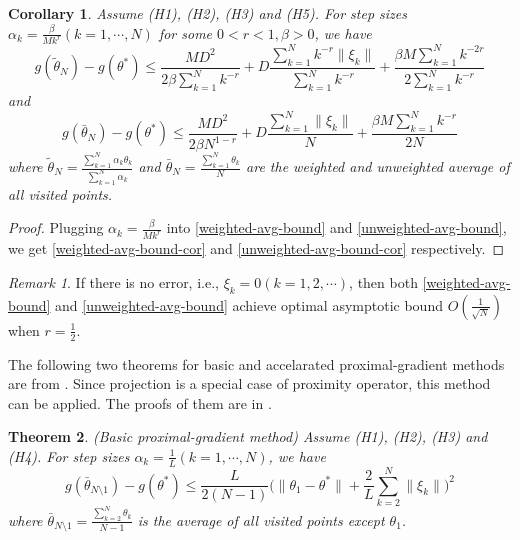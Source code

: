\documentclass[psamsfonts]{article}
\newtheorem{thm}{Theorem} %
\newtheorem{cor}[thm]{Corollary}
\theoremstyle{definition}
\theoremstyle{remark}
\newtheorem*{rem}{Remark}
\numberwithin{equation} {section}
\begin{document}
\begin{cor}
Assume (H1), (H2), (H3) and (H5). For step sizes $\alpha_k = \frac{\beta}{Mk^r}(k = 1, \cdots, N)$ for some $0 < r < 1, \beta > 0$, we have
\begin{equation}\label{weighted-avg-bound-cor}
g(\tilde{\theta}_N) - g(\theta^*) \le \frac{MD^2}{2\beta \sum_{k = 1}^N k^{-r}} + D\frac{\sum_{k=1}^{N}k^{-r} \| \xi_k \|}{\sum_{k=1}^{N}k^{-r}} + \frac{\beta M \sum_{k = 1}^N k^{-2r}}{2\sum_{k = 1}^N k^{-r}}
\end{equation}
and
\begin{equation}\label{unweighted-avg-bound-cor}
g(\bar{\theta}_N) - g(\theta^*) \le \frac{MD^2}{2\beta N^{1-r}} + D\frac{\sum_{k=1}^{N} \| \xi_k \|}{N} + \frac{\beta M \sum_{k = 1}^N k^{-r}}{2N}
\end{equation}
where $\tilde{\theta}_N = \frac{\sum_{k = 1}^N \alpha_k \theta_k}{\sum_{k = 1}^N \alpha_k}$ and $\bar{\theta}_N = \frac{\sum_{k = 1}^N \theta_k}{N}$ are the weighted and unweighted average of all visited points.
\end{cor}

\begin{proof}
Plugging $\alpha_k = \frac{\beta}{Mk^r}$ into \eqref{weighted-avg-bound} and \eqref{unweighted-avg-bound}, we get \eqref{weighted-avg-bound-cor} and \eqref{unweighted-avg-bound-cor} respectively.
\end{proof}


\begin{rem}
If there is no error, i.e., $\xi_k=0(k=1,2,\cdots)$, then both \eqref{weighted-avg-bound} and \eqref{unweighted-avg-bound} achieve optimal asymptotic bound $O(\frac{1}{\sqrt{N}})$ when $r=\frac{1}{2}$.
\end{rem}

The following two theorems for basic and accelarated proximal-gradient methods are from \cite{prox}. Since projection is a special case of proximity operator, this method can be applied. The proofs of them are in \cite{prox}.

\begin{thm}(Basic proximal-gradient method)
Assume (H1), (H2), (H3) and (H4). For step sizes $\alpha_k = \frac{1}{L}(k = 1, \cdots, N)$, we have
\begin{equation}\label{basic-prox-bound}
g(\bar{\theta}_{N\setminus 1}) - g(\theta^*) \le \frac{L}{2(N-1)}\big(\|\theta_1 - \theta^* \| + \frac{2}{L} \sum_{k=2}^{N} \|\xi_k\|\big)^2
\end{equation}
where $\bar{\theta}_{N\setminus 1} = \frac{\sum_{k=2}^N \theta_k}{N-1}$ is the average of all visited points except $\theta_1$.
\end{thm}
\end{document}
